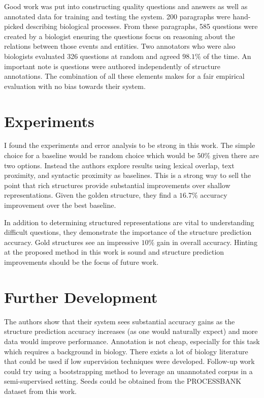 \documentclass[fleqn,11pt]{wlpeerj} %
\begin{document}
Good work was put into constructing quality questions and answers as well as annotated data for training and testing the system. 200 paragraphs were hand-picked describing biological processes. From these paragraphs, 585 questions were created by a biologist ensuring the questions focus on reasoning about the relations between those events and entities. Two annotators who were also biologists evaluated 326 questions at random and agreed $98.1\%$ of the time. An important note is questions were authored independently of structure annotations. The combination of all these elements makes for a fair empirical evaluation with no bias towards their system.

\section*{Experiments}

I found the experiments and error analysis to be strong in this work. The simple choice for a baseline would be random choice which would be $50\%$ given there are two options. Instead the authors explore results using lexical overlap, text proximity, and syntactic proximity as baselines. This is a strong way to sell the point that rich structures provide substantial improvements over shallow representations. Given the golden structure, they find a $16.7\%$ accuracy improvement over the best baseline.

In addition to determining structured representations are vital to understanding difficult questions, they demonstrate the importance of the structure prediction accuracy. Gold structures see an impressive $10\%$ gain in overall accuracy. Hinting at the proposed method in this work is sound and structure prediction improvements should be the focus of future work.

\section*{Further Development}
The authors show that their system sees substantial accuracy gains as the structure prediction accuracy increases (as one would naturally expect) and more data would improve performance. Annotation is not cheap, especially for this task which requires a background in biology. There exists a lot of biology literature that could be used if low supervision techniques were developed. Follow-up work could try using a bootstrapping method to leverage an unannotated corpus in a semi-supervised setting. Seeds could be obtained from the PROCESSBANK dataset from this work.
\end{document}
